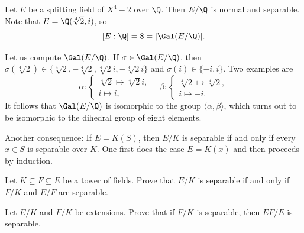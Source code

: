 \begin{example}
    Let $E$ be a splitting field of $X^4-2$ over $\Q$. 
    Then $E/\Q$ is normal and separable. Note that
    $E=\Q(\sqrt[4]{2},i)$, so 
    \[
    [E:\Q]=8=|\Gal(E/\Q)|.
    \]
    
    Let us compute
    $\Gal(E/\Q)$. If $\sigma\in\Gal(E/\Q)$, then 
    $\sigma(\sqrt[4]{2})\in\{\sqrt[4]{2},-\sqrt[4]{2},\sqrt[4]{2}i,-\sqrt[4]{2}i\}$ and 
    $\sigma(i)\in\{-i,i\}$. Two examples are 
    \[
    \alpha\colon\begin{cases}
    \sqrt[4]{2}\mapsto\sqrt[4]{2}i,\\
    i\mapsto i,
    \end{cases}
    \quad
    \beta\colon\begin{cases}
    \sqrt[4]{2}\mapsto\sqrt[4]{2},\\
    i\mapsto -i.
    \end{cases}
    \]
    It follows that 
    $\Gal(E/\Q)$ is isomorphic to the group $\langle\alpha,\beta\rangle$, which turns out to be
    isomorphic to the dihedral group
    of eight elements. 
\end{example}


Another consequence: If $E=K(S)$, then $E/K$ is separable if and only if
every $x\in S$ is separable over $K$. One first does the case $E=K(x)$ 
and then proceeds by induction. 

\begin{exercise}
\label{xca:separable1}
    Let $K\subseteq F\subseteq E$ be a tower of fields. Prove that 
    $E/K$ is separable if and only if $F/K$ and $E/F$ are separable. 
\end{exercise}



\begin{exercise}
\label{xca:separable2}
    Let $E/K$ and $F/K$ be extensions. Prove that if $F/K$ is separable, 
    then $EF/E$ is separable. 
\end{exercise}

